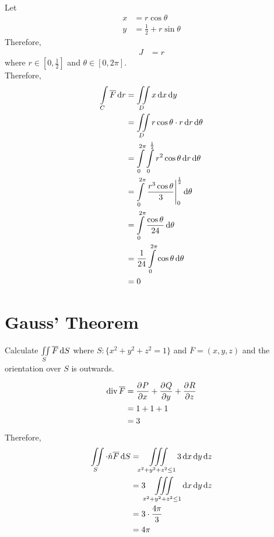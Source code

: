 \documentclass[fleqn, a4paper, 12pt, twoside]{article}
\theoremstyle{definition}
\theoremstyle{theorem}
\newcommand{\divergence}{\mathrm{div\,}}
\begin{document}
\begin{solution}
\begin{align*}
	\end{align*}
	Let
	\begin{align*}
		x &= r \cos \theta\\
		y &= \frac{1}{2} + r \sin \theta
	\end{align*}
	Therefore,
	\begin{align*}
		J &= r
	\end{align*}
	where $r \in \left[ 0 , \frac{1}{2} \right]$ and $\theta \in [0,2 \pi]$.\\
	Therefore,
	\begin{align*}
		\int\limits_{C} \overline{F} \dif r &= \iint\limits_{D} x \dif x \dif y\\
		&= \iint\limits_{D} r \cos \theta \cdot r \dif r \dif \theta\\
		&= \int\limits_{0}^{2 \pi} \int\limits_{0}^{\frac{1}{2}} r^2 \cos \theta \dif r \dif \theta\\
		&= \int\limits_{0}^{2 \pi} \left. \frac{r^3 \cos \theta}{3} \right|_{0}^{\frac{1}{2}} \dif \theta\\
		&= \int\limits_{0}^{2 \pi} \frac{\cos \theta}{24} \dif \theta\\
		&= \frac{1}{24} \int\limits_{0}^{2 \pi} \cos \theta \dif \theta\\
		&= 0
	\end{align*}
\end{solution}

\section{Gauss' Theorem}

\begin{question}
	Calculate $\iint\limits_{S} \overline{F} \dif S$ where $S : \{x^2 + y^2 + z^2 = 1\}$ and $\overline {F} = (x,y,z)$ and the orientation over $S$ is outwards.
\end{question}

\begin{solution}
	\begin{align*}
		\divergence \overline{F} &= \dpd{P}{x} + \dpd{Q}{y} + \dpd{R}{z}\\
		&= 1 + 1 + 1\\
		&= 3
	\end{align*}
	Therefore,
	\begin{align*}
		\iint\limits_{S} \cdot \hat{n} \overline{F} \dif S &= \iiint\limits_{x^2 + y^2 + z^2 \le 1} 3 \dif x \dif y \dif z\\
		&= 3 \iiint\limits_{x^2 + y^2 + z^2 \le 1} \dif x \dif y \dif z\\
		&= 3 \cdot \frac{4 \pi}{3}\\
		&= 4 \pi
	\end{align*}
\end{solution}
\end{document}
